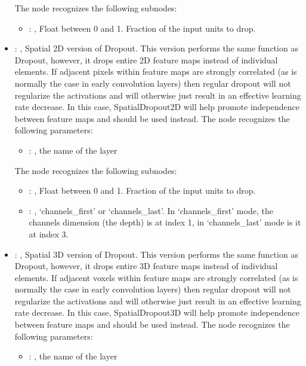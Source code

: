 \begin{itemize}
      The  node recognizes the following subnodes:
      \begin{itemize}
        \item {}: , 
          Float between 0 and 1. Fraction of the input units to drop.
      \end{itemize}

    \item {}: , 
      Spatial 2D version of Dropout. This version performs the same function as Dropout, however,
      it drops entire 2D feature maps instead of individual elements. If adjacent pixels within
      feature maps         are strongly correlated (as is normally the case in early convolution
      layers) then regular dropout will         not regularize the activations and will otherwise
      just result in an effective learning rate decrease.         In this case, SpatialDropout2D
      will help promote independence between feature maps and should         be used instead.
      The  node recognizes the following parameters:
        \begin{itemize}
          \item {}: , 
            the name of the layer
      \end{itemize}

      The  node recognizes the following subnodes:
      \begin{itemize}
        \item {}: , 
          Float between 0 and 1. Fraction of the input units to drop.

        \item {}: , 
          `channels\_first' or `channels\_last'. In `channels\_first' mode, the channels dimension
          (the depth) is at index 1, in `channels\_last' mode is it at index 3.
      \end{itemize}

    \item {}: , 
      Spatial 3D version of Dropout. This version performs the same function as Dropout, however,
      it drops entire 3D feature maps instead of individual elements. If adjacent voxels within
      feature maps         are strongly correlated (as is normally the case in early convolution
      layers) then regular dropout will         not regularize the activations and will otherwise
      just result in an effective learning rate decrease.         In this case, SpatialDropout3D
      will help promote independence between feature maps and should         be used instead.
      The  node recognizes the following parameters:
        \begin{itemize}
          \item {}: , 
            the name of the layer
      \end{itemize}


\end{itemize}
